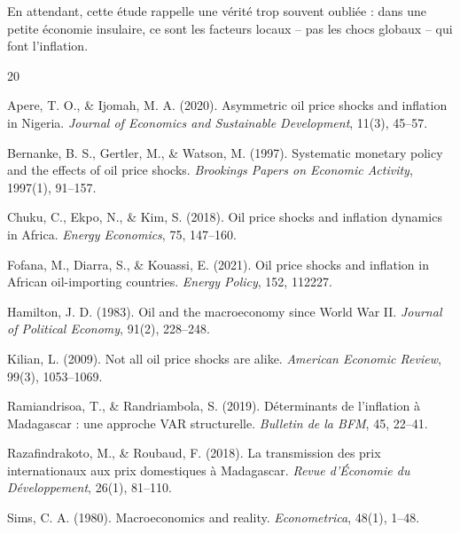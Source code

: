 \documentclass[12pt,a4paper]{article}
\begin{document}
En attendant, cette étude rappelle une vérité trop souvent oubliée : dans une petite économie insulaire, ce sont les facteurs locaux -- pas les chocs globaux -- qui font l'inflation.

\begin{thebibliography}{20}

Apere, T. O., \& Ijomah, M. A. (2020). Asymmetric oil price shocks and inflation in Nigeria. \textit{Journal of Economics and Sustainable Development}, 11(3), 45--57.

Bernanke, B. S., Gertler, M., \& Watson, M. (1997). Systematic monetary policy and the effects of oil price shocks. \textit{Brookings Papers on Economic Activity}, 1997(1), 91--157.

Chuku, C., Ekpo, N., \& Kim, S. (2018). Oil price shocks and inflation dynamics in Africa. \textit{Energy Economics}, 75, 147--160.

Fofana, M., Diarra, S., \& Kouassi, E. (2021). Oil price shocks and inflation in African oil-importing countries. \textit{Energy Policy}, 152, 112227.

Hamilton, J. D. (1983). Oil and the macroeconomy since World War II. \textit{Journal of Political Economy}, 91(2), 228--248.

Kilian, L. (2009). Not all oil price shocks are alike. \textit{American Economic Review}, 99(3), 1053--1069.

Ramiandrisoa, T., \& Randriambola, S. (2019). Déterminants de l'inflation à Madagascar : une approche VAR structurelle. \textit{Bulletin de la BFM}, 45, 22--41.

Razafindrakoto, M., \& Roubaud, F. (2018). La transmission des prix internationaux aux prix domestiques à Madagascar. \textit{Revue d'Économie du Développement}, 26(1), 81--110.

Sims, C. A. (1980). Macroeconomics and reality. \textit{Econometrica}, 48(1), 1--48.

\end{thebibliography}
\end{document}
